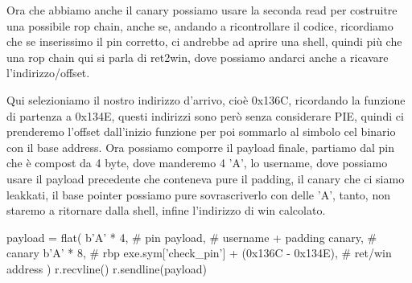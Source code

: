 \documentclass[main.tex]{subfiles}
\begin{document}
Ora che abbiamo anche il canary possiamo usare la seconda read per costruitre una possibile rop chain, anche se, andando a ricontrollare il codice, ricordiamo che se inserissimo il pin corretto, ci andrebbe ad aprire una shell, quindi più che una rop chain qui si parla di ret2win, dove possiamo andarci anche a ricavare l'indirizzo/offset.
\newpage
\begin{figure}[h]
    \centering
    \captionsetup{aboveskip=0pt}
\end{figure}

Qui selezioniamo il nostro indirizzo d'arrivo, cioè 0x136C, ricordando la funzione di partenza a 0x134E, questi indirizzi sono però senza considerare PIE, quindi ci prenderemo l'offset dall'inizio funzione per poi sommarlo al simbolo cel binario con il base address.
Ora possiamo comporre il payload finale, partiamo dal pin che è compost da 4 byte, dove manderemo 4 'A', lo username, dove possiamo usare il payload precedente che conteneva pure il padding, il canary che ci siamo leakkati, il base pointer possiamo pure sovrascriverlo con delle 'A', tanto, non staremo a ritornare dalla shell, infine l'indirizzo di win calcolato.
\begin{python}
payload = flat(
    b'A' * 4, # pin
    payload, # username + padding
    canary, # canary
    b'A' * 8, # rbp
    exe.sym['check_pin'] + (0x136C - 0x134E), # ret/win address
)
r.recvline()
r.sendline(payload)
\end{python}
\end{document}
